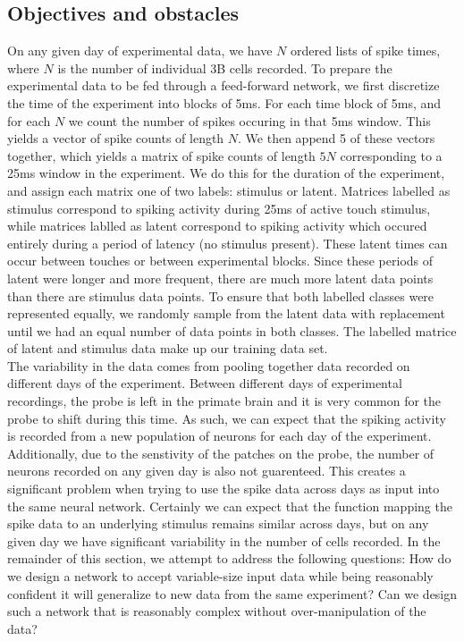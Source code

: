 \documentclass[12pt]{article}
\begin{document}
\subsection{Objectives and obstacles}
\indent On any given day of experimental data, we have $N$ ordered lists of spike times, where $N$ is the number of individual 3B cells recorded. To prepare the experimental data to be fed through a feed-forward network, we first discretize the time of the experiment into blocks of 5ms. For each time block of 5ms, and for each $N$ we count the number of spikes occuring in that 5ms window. This yields a vector of spike counts of length $N$. We then append 5 of these vectors together, which yields a matrix of spike counts of length $5N$  corresponding to a 25ms window in the experiment. We do this for the duration of the experiment, and assign each matrix one of two labels: stimulus or latent. Matrices labelled as stimulus correspond to spiking activity during 25ms of active touch stimulus, while matrices lablled as latent correspond to spiking activity which occured entirely during a period of latency (no stimulus present). These latent times can occur between touches or between experimental blocks. Since these periods of latent were longer and more frequent, there are much more latent data points than there are stimulus data points. To ensure that both labelled classes were represented equally, we randomly sample from the latent data with replacement until we had an equal number of data points in both classes. The labelled matrice of latent and stimulus data make up our training data set. \\
\indent The variability in the data comes from pooling together data recorded on different days of the experiment. Between different days of experimental recordings, the probe is left in the primate brain and it is very common for the probe to shift during this time. As such, we can expect that the spiking activity is recorded from a new population of neurons for each day of the experiment. Additionally, due to the senstivity of the patches on the probe, the number of neurons recorded on any given day is also not guarenteed. This creates a significant problem when trying to use the spike data across days as input into the same neural network. Certainly we can expect that the function mapping the spike data to an underlying stimulus remains similar across days, but on any given day we have significant variability in the number of cells recorded. In the remainder of this section, we attempt to address the following questions: How do we design a network to accept variable-size input data while being reasonably confident it will generalize to new data from the same experiment? Can we design such a network that is reasonably complex without over-manipulation of the data?
\end{document}
